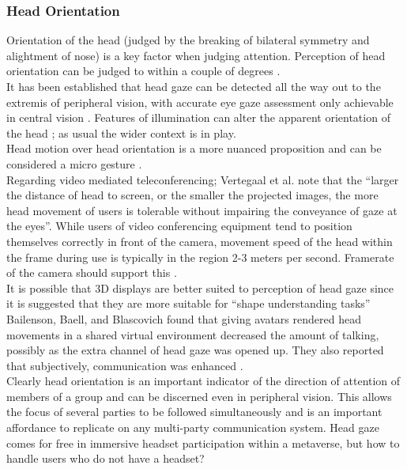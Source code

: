 \subsubsection{Head Orientation}
Orientation of the head (judged by the breaking of bilateral symmetry and alightment of nose) is a key factor when judging attention. Perception of head orientation can be judged to within a couple of degrees \cite{Wilson2000}.\\
It has been established that head gaze can be detected all the way out to the extremis of peripheral vision, with accurate eye gaze assessment only achievable in central vision \cite{Loomis2008}. Features of illumination can alter the apparent orientation of the head \cite{Troje1998}; as usual the wider context is in play.\\
Head motion over head orientation is a more nuanced proposition and can be considered a micro gesture \cite{Boker2011}.\\
Regarding video mediated teleconferencing;  Vertegaal  et al. \cite{Vertegaal00effectsof} note that  the ``larger the distance of head to screen, or the smaller the projected images, the more head movement of users is tolerable without impairing the conveyance of gaze at the eyes''. While users of video conferencing equipment tend to position themselves correctly in front of the camera, movement speed of the head within the frame during use is typically in the region 2-3 meters per second. Framerate of the camera should support this \cite{Bocker1996}.\\
                    It is possible that 3D displays are better suited to perception of head gaze since it is suggested that they are more suitable for ``shape understanding tasks'' \cite{john2001use}\\
                    Bailenson, Baell, and Blascovich found that giving avatars rendered head movements in a shared virtual environment decreased the amount of talking, possibly as the extra channel of head gaze was opened up. They also reported that subjectively, communication was enhanced \cite{Bailenson2002}. \\
                    Clearly head orientation is an important indicator of the direction of attention of members of a group and can be discerned even in peripheral vision. This allows the focus of several parties to be followed simultaneously and is an important affordance to replicate on any multi-party communication system. Head gaze comes for free in immersive headset participation within a metaverse, but how to handle users who do not have a headset?\\
